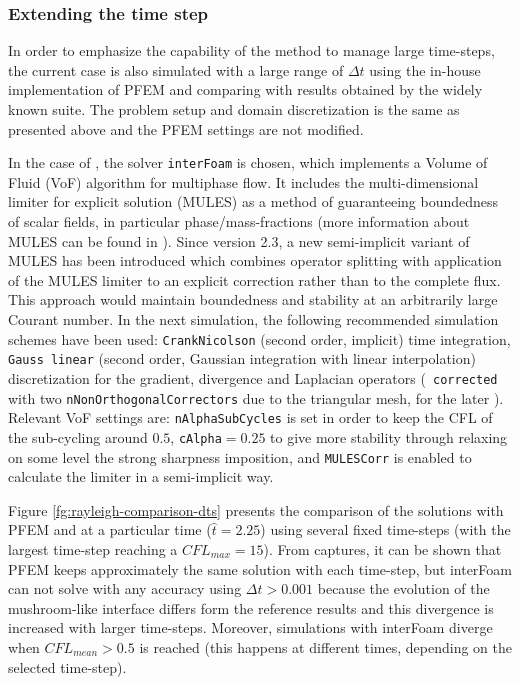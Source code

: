 \subsubsection{Extending the time step}

In order to emphasize the capability of the method to manage large time-steps, the current case is also simulated with a large range of $\Delta t$ using the in-house implementation of PFEM and comparing with results obtained by the widely known \OF suite. The problem setup and domain discretization is the same as presented above and the PFEM settings are not modified.

In the case of \OF, the solver \texttt{interFoam} is chosen, which implements a Volume of Fluid (VoF) algorithm for multiphase flow\cite{Berberovic09}\cite{Marquez2014}. It includes the multi-dimensional limiter for explicit solution (MULES) as a method of guaranteeing boundedness of scalar fields, in particular phase/mass-fractions (more information about MULES can be found in \cite{Marquez13}). Since \OF version 2.3, a new semi-implicit variant of MULES has been introduced which combines operator splitting with application of the MULES limiter to an explicit correction rather than to the complete flux. This approach would maintain boundedness and stability at an arbitrarily large Courant number. In the next simulation, the following recommended simulation schemes have been used: \texttt{CrankNicolson} (second order, implicit) time integration, \texttt{Gauss linear} (second order, Gaussian integration with linear interpolation) discretization for the gradient, divergence and Laplacian operators (\texttt{
corrected} with two \texttt{nNonOrthogonalCorrectors} due to the triangular mesh, for the later ). Relevant VoF settings are: \texttt{nAlphaSubCycles} is set in order to keep the CFL of the sub-cycling around $0.5$, \texttt{cAlpha}$=0.25$ to give more stability through relaxing on some level the strong sharpness imposition, and \texttt{MULESCorr} is enabled to calculate the limiter in a semi-implicit way.

Figure \ref{fg:rayleigh-comparison-dts} presents the comparison of the solutions with PFEM and \OF at a particular time ($\widehat{t}=2.25$) using several fixed time-steps (with the largest time-step reaching a $CFL_{max}=15$). From captures, it can be shown that PFEM keeps approximately the same solution with each time-step, but interFoam can not solve with any accuracy using $\Delta t>0.001$ because the evolution of the mushroom-like interface differs form the reference results and this divergence is increased with larger time-steps. Moreover, simulations with interFoam diverge when $CFL_{mean}>0.5$ is reached (this happens at different times, depending on the selected time-step).

